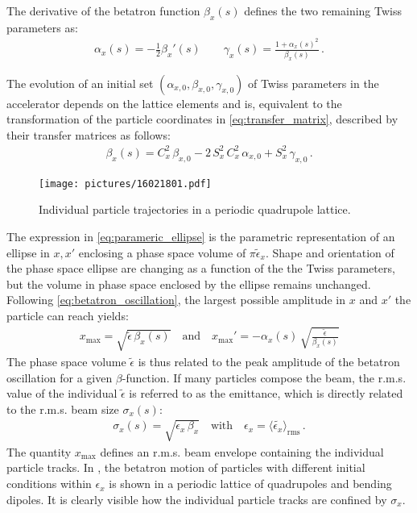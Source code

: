 The derivative of the betatron function $\beta_x(s)$ defines the two remaining Twiss parameters as:
\begin{align}
\alpha_x(s) = - \frac{1}{2} \beta_x'(s) \quad \quad \gamma_x(s) = \frac{1+\alpha_x(s)^2}{\beta_x(s)} \, .
\end{align}

The evolution of an initial set $(\alpha_{x,0},\beta_{x,0},\gamma_{x,0})$ of Twiss parameters in the accelerator depends on the lattice elements and is, equivalent to the transformation of the particle coordinates in \eqref{eq:transfer_matrix}, described by their transfer matrices as follows:
%
\begin{align}
  \beta_x(s) = C_x^2 \, \beta_{x,0} -2 \, S_x^2 \, C_x^2 \, \alpha_{x,0} + S_x^2 \, \gamma_{x,0} \, .
\end{align}
%
\begin{figure}[b]  
    \centering
    \texttt{[image: pictures/16021801.pdf]}
    \caption{Individual particle trajectories in a periodic quadrupole lattice.}  
    \label{pic:16021801}
\end{figure}
%
The expression in \eqref{eq:parameric_ellipse} is the parametric representation of an ellipse in $x,x'$ enclosing a phase space volume of $\pi \tilde{\epsilon}_x$. Shape and orientation of the phase space ellipse are changing as a function of the the Twiss parameters, but the volume in phase space enclosed by the ellipse remains unchanged. Following \eqref{eq:betatron_oscillation}, the largest possible amplitude in $x$ and $x'$ the particle can reach yields:
%
\begin{align}
  x_\text{max} = \sqrt{\tilde{\epsilon} \, \beta_x(s)} \quad \text{and} \quad x_\text{max}' = - \alpha_x (s) \, \sqrt{\frac{\tilde{\epsilon}}{\beta_x(s)}}
\end{align}
%
The phase space volume $\tilde{\epsilon}$ is thus related to the peak amplitude of the betatron oscillation for a given $\beta$-function. If many particles compose the beam, the r.m.s. value of the individual $\tilde{\epsilon}$ is referred to as the emittance, which is directly related to the r.m.s. beam size $\sigma_x(s)$:
%
\begin{align}
  \sigma_x (s) = \sqrt{\epsilon_x \, \beta_x} \quad \text{with} \quad \epsilon_x = \langle \tilde{\epsilon_x} \rangle_{\text{rms}} \, .
\end{align}
%
The quantity $x_\text{max}$ defines an r.m.s. beam envelope containing the individual particle tracks. In , the betatron motion of particles with different initial conditions within $\epsilon_x$ is shown in a periodic lattice of quadrupoles and bending dipoles. It is clearly visible how the individual particle tracks are confined by $\sigma_x$.
